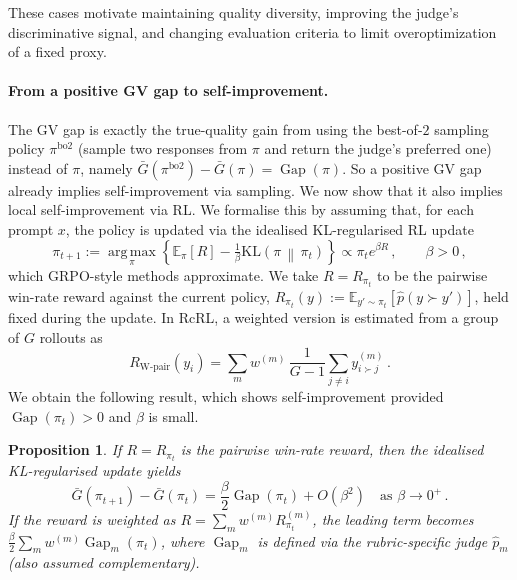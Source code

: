 \documentclass{article}
\theoremstyle{plain}
\newtheorem{proposition}[theorem]{Proposition}
\theoremstyle{definition}
\theoremstyle{remark}
\DeclareMathOperator{\gap}{Gap}
\newcommand{\kl}[2]{%
  \mathrm{KL}\!\left(#1\,\middle\|\,#2\right)%
}
\begin{document}
These cases motivate maintaining quality diversity, improving the judge's discriminative signal, and changing evaluation criteria to limit overoptimization of a fixed proxy.

\paragraph{From a positive GV gap to self-improvement.}
The GV gap is exactly the true-quality gain from using the best-of-$2$ sampling policy $\pi^{\mathrm{bo2}}$ (sample two responses from $\pi$ and return the judge's preferred one) instead of $\pi$, namely $\bar{G}(\pi^{\mathrm{bo2}})-\bar{G}(\pi)=\gap(\pi)$. So a positive GV gap already implies self-improvement via sampling. We now show that it also implies local self-improvement via RL. We formalise this by assuming that, for each prompt $x$, the policy is updated via the idealised KL-regularised RL update
\begin{equation}\label{eq:rl-update}
  \pi_{t+1}:=\operatorname*{arg\,max}_{\pi}\left\{\mathbb{E}_{\pi}[R]-\tfrac{1}{\beta}\kl{\pi}{\pi_t}\right\}\propto\pi_t e^{\beta R}\,,\qquad\beta>0\,,
\end{equation}
which GRPO-style methods approximate. We take $R=R_{\pi_t}$ to be the pairwise win-rate reward against the current policy,
$R_{\pi_t}(y):=\mathbb{E}_{y'\sim\pi_t}[\hat{p}(y\succ y')]$,
held fixed during the update. In RcRL, a weighted version is estimated from a group of $G$ rollouts as
\[
  R_{\mathrm{W\text{-}pair}}(y_i)=\sum_m w^{(m)}\,\frac{1}{G-1}\sum_{j\ne i}y^{(m)}_{i\succ j}\,.
\]
We obtain the following result, which shows self-improvement provided $\gap(\pi_t)>0$ and $\beta$ is small.

\begin{proposition}
If $R=R_{\pi_t}$ is the pairwise win-rate reward, then the idealised KL-regularised update yields
\[
  \bar{G}(\pi_{t+1})-\bar{G}(\pi_t)=\frac{\beta}{2}\gap(\pi_t)+O(\beta^2)\quad\text{as }\beta\to0^+\,.
\]
If the reward is weighted as $R=\sum_m w^{(m)}R^{(m)}_{\pi_t}$, the leading term becomes $\frac{\beta}{2}\sum_m w^{(m)}\gap_m(\pi_t)$, where $\gap_m$ is defined via the rubric-specific judge $\hat{p}_m$ (also assumed complementary).
\end{proposition}
\end{document}
